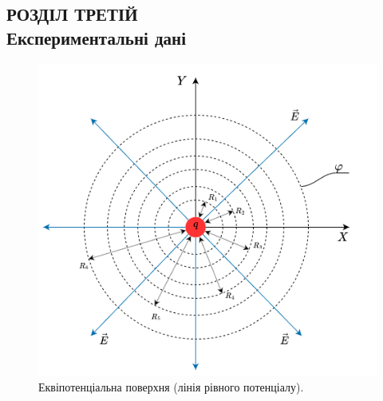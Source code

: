 \documentclass[a4paper,12pt]{article}
\begin{document}
	
	
\newpage
	\begin{center}
		\section* {РОЗДІЛ ТРЕТІЙ\\Експериментальні дані}
	\end{center}

	\begin{figure}[h!]
		\centering
		\begin{minipage}[h]{1\linewidth}
			\includegraphics[width=1\linewidth]{Prt sc/Figure_2_1.png}
			\caption{Еквіпотенціальна поверхня  (лінія рівного потенціалу).}
			\label{Figure_2}
		\end{minipage}
	\end{figure}
\end{document}
